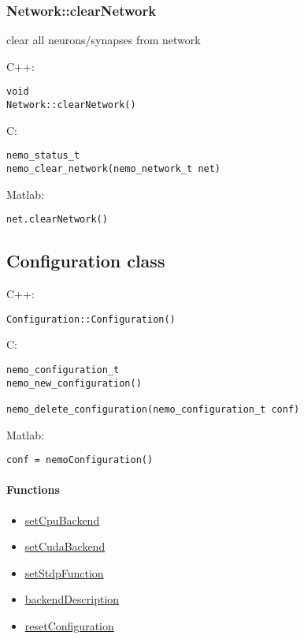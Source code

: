 \clearpage
\subsubsection*{Network::clearNetwork}
\label{fn: clearNetwork}
clear all neurons/synapses from network


\noindent C++:
\begin{lstlisting}[aboveskip=2pt]
void
Network::clearNetwork()
\end{lstlisting}

\noindent C:
\begin{lstlisting}[aboveskip=2pt]
nemo_status_t
nemo_clear_network(nemo_network_t net)
\end{lstlisting}

\noindent Matlab:
\begin{lstlisting}[aboveskip=2pt]
net.clearNetwork()
\end{lstlisting}

\clearpage
\subsection{Configuration class}
\label{Configuration}

\noindent C++:
\begin{lstlisting}[aboveskip=2pt]
Configuration::Configuration()
\end{lstlisting}

\noindent C:
\begin{lstlisting}[aboveskip=2pt]
nemo_configuration_t
nemo_new_configuration()
 
nemo_delete_configuration(nemo_configuration_t conf)
\end{lstlisting}

\noindent Matlab:
\begin{lstlisting}[aboveskip=2pt]
conf = nemoConfiguration()
\end{lstlisting}
\paragraph{Functions}
\begin{itemize}
\item \hyperref[fn: setCpuBackend]{setCpuBackend}
\item \hyperref[fn: setCudaBackend]{setCudaBackend}
\item \hyperref[fn: setStdpFunction]{setStdpFunction}
\item \hyperref[fn: backendDescription]{backendDescription}
\item \hyperref[fn: resetConfiguration]{resetConfiguration}
\end{itemize}
\clearpage
